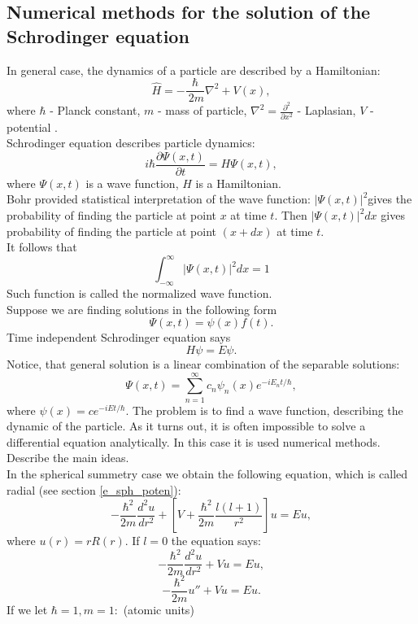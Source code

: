 \documentclass[a4paper, 14pt]{article}
\begin{document}
\subsection{Numerical methods for the solution of the Schrodinger equation} \label{sec:numerical}
In general case, the dynamics of a particle are described by a Hamiltonian: 
\begin{equation}\label{hamiltonian}
	\hat{H} =- \dfrac{\hbar}{\ {2}{m}} \nabla^2  + V(x),
\end{equation}
where $\hbar$ - Planck constant, ${m}$ - mass of particle, $\nabla^2 = \frac{\partial^2}{\partial x^2}$ - Laplasian,  $V$ - potential .\\
Schrodinger equation describes particle dynamics:
\begin{equation}\label{schr_eq}
	i \hbar \frac{\partial \Psi(x, t)}{\partial t} = H \Psi(x,t),
\end{equation}
where $\Psi(x, t)$ is a wave function, $H$ is a Hamiltonian.\\
Bohr provided statistical interpretation of the wave function: $|\Psi(x,t)|^2 $gives the probability of finding the particle at point $x$ at time $t$. Then $|\Psi(x,t)|^2 dx $ gives probability of finding the particle at point $(x+dx)$ at time $t.$\\
It follows that 
$$\int_{-\infty}^\infty |\Psi(x,t)|^2 dx = 1$$
Such function is called the normalized wave function.\\
Suppose we are finding solutions in the following form $$\Psi(x, t) = \psi(x) f(t).$$
Time independent Schrodinger equation says
\begin{equation}\label{t-indep}
	H \psi = E \psi.
\end{equation}
Notice, that general solution is a linear combination of the separable solutions: $$\Psi(x,t) = \sum_{n=1}^\infty c_n \psi_n (x) e^{-i E_nt/ \hbar},$$ where $\psi(x) = c e^{-iEt/ \hbar}.$
The problem is to find a wave function, describing the dynamic of the particle. As it turns out, it is often impossible to solve a differential equation analytically. In this case it is used numerical methods. Describe the main ideas.\\
In the spherical summetry case we obtain the following equation, which is called radial (see section \ref{e_sph_poten}): 
$$-\frac{\hbar^2}{2m}\frac{d^2 u}{d r^2}+[V+\frac{\hbar^2}{2m}\frac{l(l+1)}{r^2}]u = Eu,$$
where $u(r) = r R(r).$ 
If  $l=0$ the equation says:
$$-\frac{\hbar^2}{2m}\frac{d^2 u}{d r^2}+Vu = Eu,$$
$$-\frac{\hbar^2}{2m}u''+Vu = Eu.$$
If we let $\hbar = 1, m=1:$ (atomic units)
\end{document}
